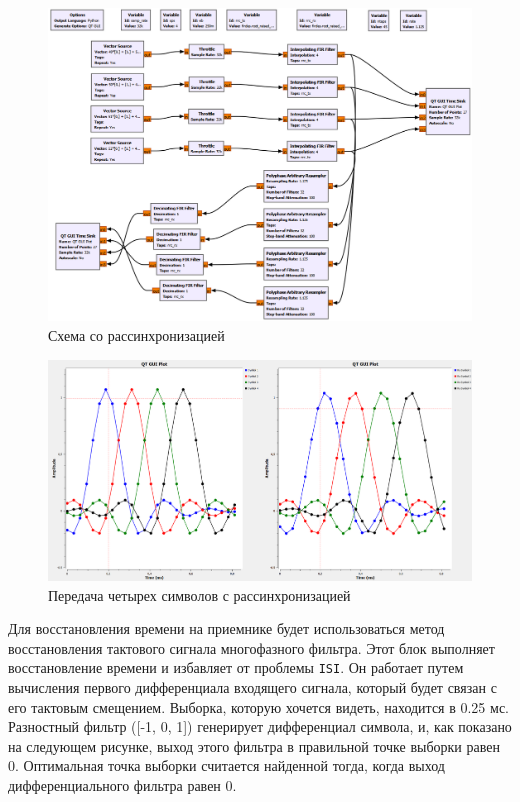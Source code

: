 \documentclass[a4paper]{article}
\begin{document}
            \begin{figure}[H]
                \centering
                \includegraphics[width=\textwidth]{ex_3_3.png}
                \caption{Схема со рассинхронизацией}
                \label{fig:ex_3_3}
            \end{figure}
            
            \begin{figure}[H]
                \centering
                \includegraphics[width=\textwidth]{ex_3_4.png}
                \caption{Передача четырех символов с рассинхронизацией}
                \label{fig:ex_3_4}
            \end{figure}
            
            Для восстановления времени на приемнике будет использоваться метод восстановления тактового сигнала многофазного фильтра. Этот блок выполняет восстановление времени и избавляет от проблемы \texttt{ISI}. Он работает путем вычисления первого дифференциала входящего сигнала, который будет связан с его тактовым смещением. Выборка, которую хочется видеть, находится в 0.25 мс. Разностный фильтр ([-1, 0, 1]) генерирует дифференциал символа, и, как показано на следующем рисунке, выход этого фильтра в правильной точке выборки равен 0. Оптимальная точка выборки считается найденной тогда, когда выход дифференциального фильтра равен 0.
            
\end{document}
